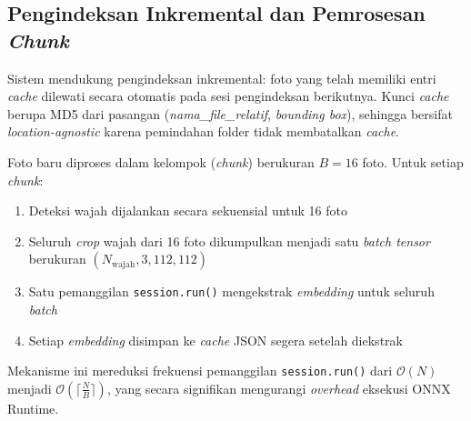 \subsection{Pengindeksan Inkremental dan Pemrosesan \textit{Chunk}}

Sistem mendukung pengindeksan inkremental: foto yang telah memiliki entri \textit{cache} dilewati secara otomatis pada sesi pengindeksan berikutnya. Kunci \textit{cache} berupa MD5 dari pasangan (\textit{nama\_file\_relatif}, \textit{bounding box}), sehingga bersifat \textit{location-agnostic} karena pemindahan folder tidak membatalkan \textit{cache}.

Foto baru diproses dalam kelompok (\textit{chunk}) berukuran $B = 16$ foto. Untuk setiap \textit{chunk}:

\begin{enumerate}
    \item Deteksi wajah dijalankan secara sekuensial untuk 16 foto
    \item Seluruh \textit{crop} wajah dari 16 foto dikumpulkan menjadi satu \textit{batch tensor} berukuran $(N_{\text{wajah}}, 3, 112, 112)$
    \item Satu pemanggilan \texttt{session.run()} mengekstrak \textit{embedding} untuk seluruh \textit{batch}
    \item Setiap \textit{embedding} disimpan ke \textit{cache} JSON segera setelah diekstrak
\end{enumerate}

Mekanisme ini mereduksi frekuensi pemanggilan \texttt{session.run()} dari $\mathcal{O}(N)$ menjadi $\mathcal{O}\left(\lceil \frac{N}{B} \rceil\right)$, yang secara signifikan mengurangi \textit{overhead} eksekusi ONNX Runtime.